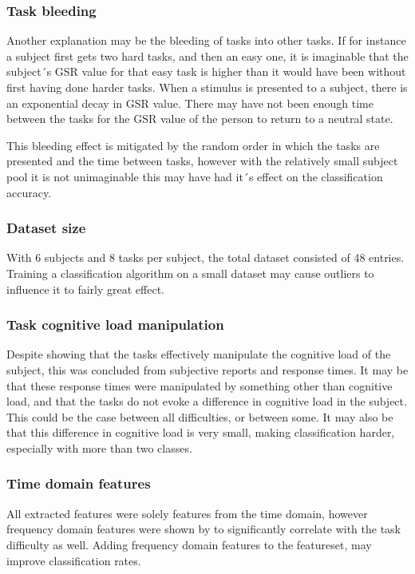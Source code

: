 \documentclass[11pt,leqno,a4paper]{report} %
\begin{document}
\subsubsection{Task bleeding}
Another explanation may be the bleeding of tasks into other tasks. If for instance a subject first gets two hard tasks, and then an easy one, it is imaginable that the subject´s GSR value for that easy task is higher than it would have been without first having done harder tasks. When a stimulus is presented to a subject, there is an exponential decay in GSR value. There may have not been enough time between the tasks for the GSR value of the person to return to a neutral state.

This bleeding effect is mitigated by the random order in which the tasks are presented and the time between tasks, however with the relatively small subject pool it is not unimaginable this may have had it´s effect on the classification accuracy.


\subsubsection{Dataset size}
With 6 subjects and 8 tasks per subject, the total dataset consisted of 48 entries. Training a classification algorithm on a small dataset may cause outliers to influence it to fairly great effect.

\subsubsection{Task cognitive load manipulation}
Despite \citet{Nourbakhsh2013} showing that the tasks effectively manipulate the cognitive load of the subject, this was concluded from subjective reports and response times. It may be that these response times were manipulated by something other than cognitive load, and that the tasks do not evoke a difference in cognitive load in the subject. This could be the case between all difficulties, or between some. It may also be that this difference in cognitive load is very small, making classification harder, especially with more than two classes.

\pagebreak

\subsubsection{Time domain features}
All extracted features were solely features from the time domain, however frequency domain features were shown by \citep{Nourbakhsh2012} to significantly correlate with the task difficulty as well. Adding frequency domain features to the featureset, may improve classification rates.
\end{document}

